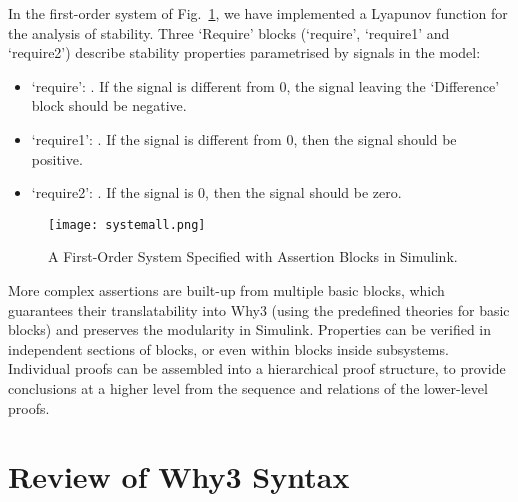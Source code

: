 \documentclass[a4paper]{article}
\begin{document}
In the first-order system of Fig.~\ref{systemcomplex}, we have implemented a Lyapunov function  for the analysis of stability. Three `Require'  blocks (`require', `require1' and `require2') describe stability properties parametrised by signals in the model: 
\begin{itemize}
\item `require': . If the signal  is different from 0, the signal leaving the `Difference' block should be negative.
\item `require1': . If the signal  is different from 0, then the signal  should be positive. 
\item `require2': . If the signal  is 0, then the signal  should be zero.   
\end{itemize}

\begin{figure}[!t]
\centering
\texttt{[image: systemall.png]}
\caption{A First-Order System Specified with Assertion Blocks in Simulink.}
\label{systemcomplex}
\end{figure}

More complex assertions are built-up from multiple basic blocks, which guarantees their translatability into Why3 (using the predefined theories for basic blocks) and preserves the modularity in Simulink. Properties can be verified in independent sections of blocks, or even within blocks inside subsystems. Individual proofs  can be assembled into a hierarchical proof structure, to provide conclusions at a higher level from the sequence and relations of the lower-level proofs.


\section{Review of Why3 Syntax} \label{Why3syntax}
\end{document}
